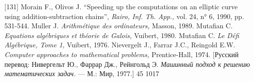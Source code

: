 \documentclass{../../template/mai_book}
\begin{document}
[131] Morain F., Olivos J. “Speeding up the computations on an elliptic
curve using addition-subtraction chains”, {\itshape Rairo, Inf. Th. App.,} vol. 24, n° 6, 1990, pp. 531-544. \newline
[132] Muller J. {\itshape Arithm\'{e}tique des ordinateurs,} Masson, 1989. \newline
[133] Mutafian C. {\itshape Equations alg\'{e}briques et th\'{e}orie de Galois,} Vuibert, 1980. \newline
[134] Mutafian C. {\itshape Le D\'{e}fi Alg\'{e}brique, Tome 1,} Vuibert, 1976. \newline
[135] Nievergelt J., Farrar J.C., Reingold E.W. {\itshape Computer approaches to \newline mathematical problems,} Prentice-Hall, 1974. [Русский перевод: Нивергельт Ю., Фаррар Дж., Рейнгольд Э. {\itshape Машинный подход к решению математических задач.} — М.: Мир, 1977.] \newline
\newline 
\newline 
\newline 
\newline 
\newline
{\footnotesize 45 1017} 
\end{document}
